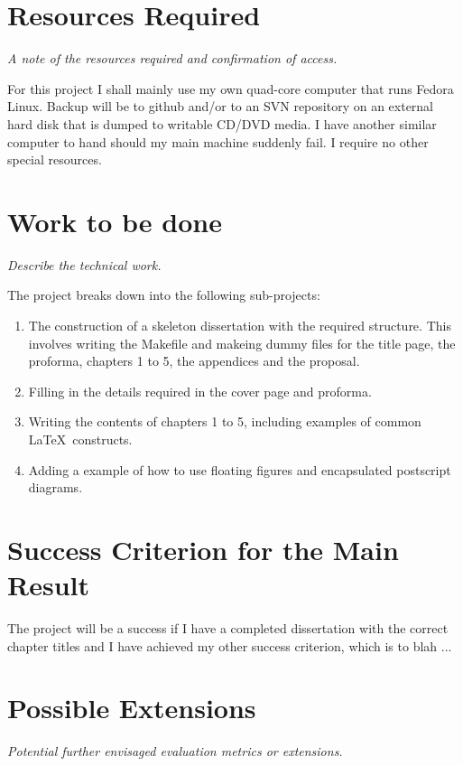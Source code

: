 \section*{Resources Required}

  {\em A note of the resources required and confirmation of access.}

  For this project I shall mainly use my own quad-core computer that runs
  Fedora Linux. Backup will be to github and/or to an SVN repository on an
  external hard disk that is dumped to writable CD/DVD media.  I have another
  similar computer to hand should my main machine suddenly fail.  I require no
  other special resources.

\section*{Work to be done}

  {\em Describe the technical work.}

  The project breaks down into the following sub-projects:

  \begin{enumerate}
    \item The construction of a skeleton dissertation with the required
    structure. This involves writing the Makefile and makeing dummy files for
    the title page, the proforma, chapters 1 to 5, the appendices and the
    proposal.

    \item Filling in the details required in the cover page and proforma.

    \item Writing the contents of chapters 1 to 5, including examples of common
    \LaTeX\ constructs.

    \item Adding a example of how to use floating figures and encapsulated
    postscript diagrams.
  \end{enumerate}

\section*{Success Criterion for the Main Result}

  The project will be a success if I have a completed dissertation with the
  correct chapter titles and I have achieved my other success criterion, which
  is to blah ...

\section*{Possible Extensions}
  {\em Potential further envisaged evaluation metrics or extensions.}

